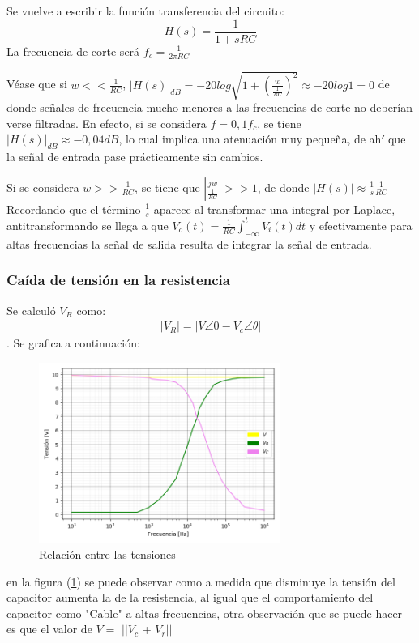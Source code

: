 \documentclass[11pt, a4paper]{article}
\begin{document}
Se vuelve a escribir la función transferencia del circuito: \begin{equation*}
    H(s)=\frac{1}{1+sRC}
\end{equation*}
La frecuencia de corte será $f_c=\frac{1}{2\pi RC}$

Véase que si $w<<\frac{1}{RC}$, $|H(s)|_{dB}=-20log\sqrt{1+(\frac{w}{\frac{1}{RC}})^2}\approx-20log1=0$ de donde señales de frecuencia mucho menores a las frecuencias de corte no deberían verse filtradas. En efecto, si se considera $f=0,1f_c$, se tiene $|H(s)|_{dB}\approx-0,04dB$, lo cual implica una atenuación muy pequeña, de ahí que la señal de entrada pase prácticamente sin cambios.

Si se considera $w>>\frac{1}{RC}$, se tiene que $|\frac{jw}{\frac{1}{RC}}|>>1$, de donde $|H(s)|\approx\frac{1}{s}\frac{1}{RC}$ Recordando que el término $\frac{1}{s}$ aparece al transformar una integral por Laplace, antitransformando se llega a que $V_o(t)=\frac{1}{RC}\int_{-\infty}^{t}V_i(t)dt $ y efectivamente para altas frecuencias la señal de salida resulta de integrar la señal de entrada.

\subsubsection*{Caída de tensión en la resistencia}

Se calculó $V_R$  como:
\begin{align}
|V_R| = |V\angle0 - V_c\angle{\theta}|
 \end{align}
. Se grafica a continuación:

\begin{figure}[H]
	\centering
	\includegraphics[width=0.7\textwidth]{Tensiones.png}
	\caption{Relación entre las tensiones} 
	\label{graf:Tensiones}
\end{figure}
en la figura (\ref{graf:Tensiones}) se puede observar como a medida que disminuye la tensión del capacitor aumenta la de la resistencia, al igual que el comportamiento del capacitor como "Cable" a altas frecuencias,  otra observación que se puede hacer es que el valor de $V=$ $ ||V_c$ + $V_r||$ 
\end{document}
